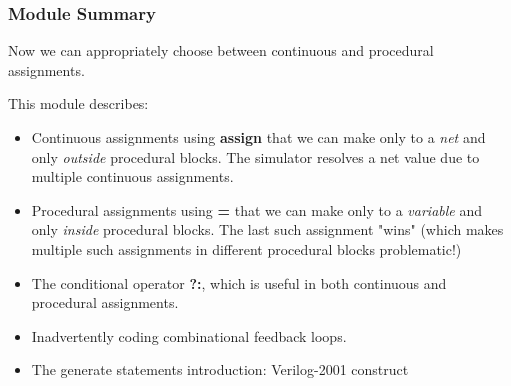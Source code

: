 \documentclass[t, notes, xcolor=table]{beamer}
\begin{document}
\begin{frame}
\frametitle{Module Summary}
\scriptsize{
Now we can appropriately choose between continuous and procedural assignments.
\newline

This module describes:
\begin{itemize}
\item Continuous assignments using \textbf{assign} that we can make only to a \textit{net} and only \textit{outside} procedural blocks. The simulator resolves a net value due to multiple continuous assignments.
\item Procedural assignments using \textbf{=} that we can make only to a \textit{variable} and only \textit{inside} procedural blocks. The last such assignment "wins" (which makes multiple such assignments in different procedural blocks problematic!)
\item The conditional operator \textbf{?:}, which is useful in both continuous and procedural assignments.
\item Inadvertently coding combinational feedback loops.
\item The generate statements introduction: Verilog-2001 construct
\end{itemize}
}
\end{frame}
\end{document}
